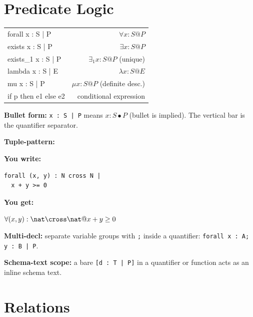 \documentclass[10pt,landscape,a4paper]{article}
\newenvironment{exwrite}%
  {\par\nobreak\noindent\scriptsize\textbf{You write:}\par\nobreak\vspace{0pt}\scriptsize}%
  {\vspace{1pt}\nobreak}
\newenvironment{exget}%
  {\par\nobreak\noindent\scriptsize\textbf{You get:}\par\nobreak\vspace{0pt}\small}%
  {\par\vspace{3pt}}
\begin{document}
\begin{multicols}{2}
\section{Predicate Logic}

\begin{tabularx}{\columnwidth}{LR}
forall x : S | P     & $\forall x : S @ P$ \\
exists x : S | P     & $\exists x : S @ P$ \\
exists\_1 x : S | P  & $\exists_1 x : S @ P$ (unique) \\
lambda x : S | E     & $\lambda x : S @ E$ \\
mu x : S | P         & $\mu x : S @ P$ (definite desc.) \\
if p then e1 else e2 & conditional expression \\
\end{tabularx}

{\footnotesize \textbf{Bullet form:} \texttt{x : S | P} means $x : S \bullet P$ (bullet is implied). The vertical bar is the quantifier separator.}

\smallskip
{}
\textbf{Tuple-pattern:}

\begin{exwrite}%
\begin{verbatim}
forall (x, y) : N cross N |
  x + y >= 0
\end{verbatim}
\end{exwrite}
\begin{exget}%
\begin{center}
$\forall (x, y) : \nat \cross \nat @ x + y \geq 0$
\end{center}
\end{exget}

{\footnotesize \textbf{Multi-decl:} separate variable groups with \texttt{;} inside a quantifier: \texttt{forall x : A; y : B | P}.}

{\footnotesize \textbf{Schema-text scope:} a bare \texttt{[d : T | P]} in a quantifier or function acts as an inline schema text.}

\section{Relations}


\end{multicols}
\end{document}
